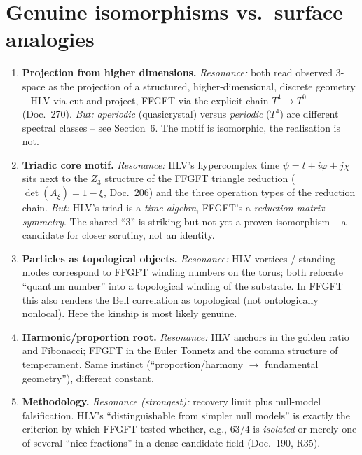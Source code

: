 \section{Genuine isomorphisms vs.\ surface analogies}

\begin{enumerate}
\item \textbf{Projection from higher dimensions.}
\emph{Resonance:} both read observed 3-space as the projection of a structured, higher-dimensional,
discrete geometry -- HLV via cut-and-project, FFGFT via the explicit chain $T^4\!\to\!T^0$ (Doc.~270).
\emph{But:} \emph{aperiodic} (quasicrystal) versus \emph{periodic} ($T^4$) are different spectral
classes -- see Section~6. The motif is isomorphic, the realisation is not.

\item \textbf{Triadic core motif.}
\emph{Resonance:} HLV's hypercomplex time $\psi=t+i\varphi+j\chi$ sits next to the $Z_3$ structure of
the FFGFT triangle reduction ($\det(A_\xi)=1-\xi$, Doc.~206) and the three operation types of the
reduction chain.
\emph{But:} HLV's triad is a \emph{time algebra}, FFGFT's a \emph{reduction-matrix symmetry}. The
shared \enquote{3} is striking but not yet a proven isomorphism -- a candidate for closer scrutiny,
not an identity.

\item \textbf{Particles as topological objects.}
\emph{Resonance:} HLV vortices / standing modes correspond to FFGFT winding numbers on the torus;
both relocate \enquote{quantum number} into a topological winding of the substrate. In FFGFT this also
renders the Bell correlation as topological (not ontologically nonlocal). Here the kinship is most
likely genuine.

\item \textbf{Harmonic/proportion root.}
\emph{Resonance:} HLV anchors in the golden ratio and Fibonacci; FFGFT in the Euler Tonnetz and the
comma structure of temperament. Same instinct (\enquote{proportion/harmony $\to$ fundamental
geometry}), different constant.

\item \textbf{Methodology.}
\emph{Resonance (strongest):} recovery limit plus null-model falsification. HLV's \enquote{distinguishable
from simpler null models} is exactly the criterion by which FFGFT tested whether, e.g., $63/4$ is
\emph{isolated} or merely one of several \enquote{nice fractions} in a dense candidate field (Doc.~190,
R35).
\end{enumerate}

